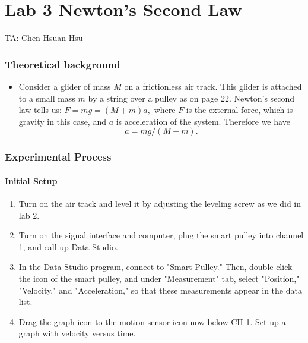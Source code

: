 \documentclass{article}
\begin{document}
\part*{Lab 3 Newton's Second Law}
TA: Chen-Hsuan Hsu\\
\vspace{-0.3in}
\section*{Theoretical background}
\begin{itemize}

\item Consider a glider of mass $M$ on a frictionless air track. This glider is attached to a small mass $m$ by a string over a pulley as on page 22. Newton's second law tells us:
\(
F = mg = (M+m)a,
\)
where $F$ is the external force, which is gravity in this case, and $a$ is acceleration of the system. Therefore we have
\[
a = mg / (M+m).
\]



\end{itemize}

\section*{Experimental Process}

\subsection*{Initial Setup}
\begin{enumerate}
\item Turn on the air track and level it by adjusting the leveling screw as we did in lab 2. 

\item Turn on the signal interface and computer, plug the smart pulley into channel 1, and call up Data Studio.

\item In the Data Studio program, connect  to "Smart Pulley." Then, double click the icon of the smart pulley, and under "Measurement" tab, select "Position," "Velocity," and "Acceleration," so that these measurements appear in the data list.

\item Drag the graph icon to the motion sensor icon now below CH 1. Set up a graph with velocity versus time. 

\end{enumerate}
\end{document}
